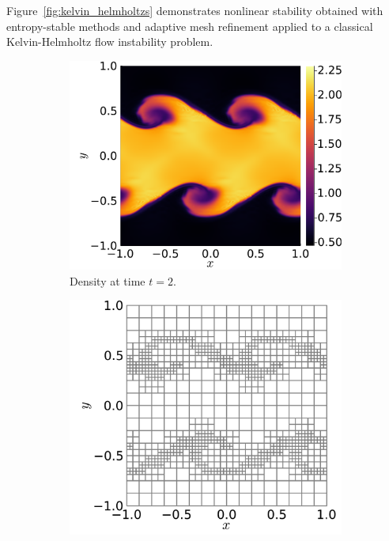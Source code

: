 \documentclass[hidelinks]{juliacon} %
\begin{document}
Figure~\ref{fig:kelvin_helmholtzs} demonstrates nonlinear stability
obtained with entropy-stable methods and adaptive mesh refinement applied to a
classical Kelvin-Helmholtz flow instability problem.
\begin{figure}[!h]
  \begin{subfigure}{0.53\linewidth}
    \includegraphics[width=\textwidth]{../figures/kelvin_helmholtz_density_t2}
    \caption{Density at time $t = 2$.}
  \end{subfigure}%
  \hspace*{\fill}
  \begin{subfigure}{0.47\linewidth}
    \includegraphics[width=\textwidth]{../figures/kelvin_helmholtz_mesh_t2}

\end{subfigure}
\end{figure}
\end{document}
